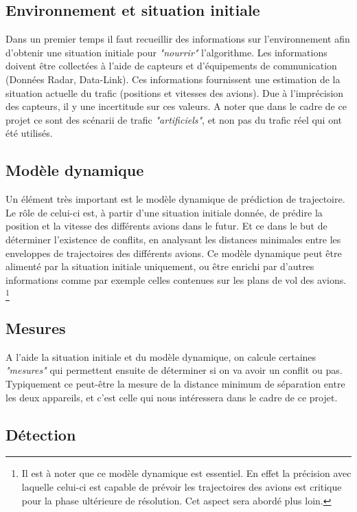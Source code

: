 \subsection*{Environnement et situation initiale}

Dans un premier temps il faut recueillir des informations sur l'environnement afin d'obtenir une situation initiale pour \textit{"nourrir"} l'algorithme. Les informations doivent être collectées à l'aide de capteurs et d'équipements de communication (Données Radar, Data-Link). Ces informations fournissent une estimation de la situation actuelle du trafic (positions et vitesses des avions). Due à l'imprécision des capteurs, il y une incertitude sur ces valeurs. A noter que dans le cadre de ce projet ce sont des scénarii de trafic \textit{"artificiels"}, et non pas du trafic réel qui ont été utilisés.

\subsection*{Modèle dynamique}

Un élément très important est le modèle dynamique de prédiction de trajectoire.  Le rôle de celui-ci est, à partir d'une situation initiale donnée, de prédire la position et la vitesse des différents avions dans le futur. Et ce dans le but de déterminer l'existence de conflits, en analysant les distances minimales entre les enveloppes de trajectoires des différents avions. Ce modèle dynamique peut être alimenté par la situation initiale uniquement, ou être enrichi par d'autres informations comme par exemple celles contenues sur les plans de vol des avions. \footnote{Il est à noter que ce modèle dynamique est essentiel. En effet la précision avec laquelle celui-ci est capable de prévoir les trajectoires des avions est critique pour la phase ultérieure de résolution. Cet aspect sera abordé plus loin.}

\subsection*{Mesures}

A l'aide la situation initiale et du modèle dynamique, on calcule certaines \textit{"mesures"} qui permettent ensuite de déterminer si on va avoir un conflit ou pas. Typiquement ce peut-être la mesure de la distance minimum de séparation entre les deux appareils, et c'est celle qui nous intéressera dans le cadre de ce projet.

\subsection*{Détection}

